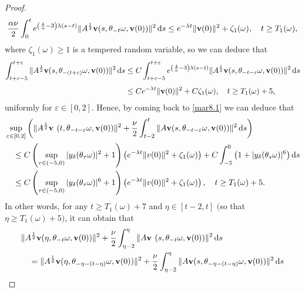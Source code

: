 \documentclass{elsarticle}
\theoremstyle{definition}
\numberwithin{equation}{section}
\renewcommand{\d}{{\rm{d}}}
\begin{document}
\begin{proof}
\begin{align*}
  \frac {\alpha  \nu }2\int_0^te^{ \left( \frac 4 \alpha -3  \right) \lambda (s-t)}\|A^{\frac12}\textbf{v}(s, \theta_{-t}\omega, \textbf{v}(0))\|^2\, \d s
 \leq e^{-\lambda t}\|\textbf{v}(0)\|^2
 + \zeta_1(\omega) ,\quad t\geq T_1(\omega) ,
 \end{align*}
where $\zeta_1(\omega)\geq 1$ is a tempered random variable,
so we can deduce that
\begin{align*}
  \int^{t+\varepsilon}_{t+\varepsilon-5}  \|A^{\frac12}\textbf{v}(s,\theta_{-(t+\varepsilon)} \omega, \textbf{v}(0)) \|^2 \, \d s
  &\leq  C \int^{t+\varepsilon}_{t+\varepsilon-5}  e^{ \left( \frac 4 \alpha -3  \right) \lambda (s-t)}\|A^{\frac12}\textbf{v}(s,\theta_{-t-\varepsilon} \omega, \textbf{v}(0)) \|^2 \, \d s \\[0.8ex]
  & \leq Ce^{-\lambda t}\|\textbf{v}(0)\|^2
 + C \zeta_1(\omega) ,\quad t\geq T_1(\omega)+5 ,
\end{align*}
uniformly for $\varepsilon \in [0,2]$.  Hence, by coming back to  \eqref{mar8.1} we can deduce that
\begin{align}
 &\sup_{\varepsilon \in [0,2]} \left(\|A^{\frac12}\textbf{v }(t,\theta_{-t-\varepsilon} \omega, \textbf{v}(0)) \|^2  +  \frac{\nu }{2} \int_{t-2}^t  \|A\textbf{v} (s,\theta_{-t-\varepsilon} \omega, \textbf{v}(0)) \|^2 \, \d s\right ) \nonumber \\
&\quad \leq   C\left (  \sup_{\tau\in (-5,0)}|y_\delta(\theta_\tau\omega)|^2+1\right)\left(e^{-\lambda t}\|v(0)\|^2
 +   \zeta_1(\omega)   \right) + C\int^{0}_{-5} \left (1 +|y_\delta(\theta_s\omega)|^6 \right )    \d s \nonumber \\
 & \quad \leq   C\left (  \sup_{\tau\in (-5,0)}|y_\delta(\theta_\tau\omega)|^6+1\right)\left(e^{-\lambda t}\|v(0)\|^2
 +   \zeta_1(\omega)   \right)  , \quad t\geq T_1(\omega)+5.  \nonumber
\end{align}
 In other words,  for any  $t\geq T_1(\omega)+7$ and $\eta\in [t-2,t ]$ $($so that $\eta\geq T_1(\omega)+5)$, it can obtain that
\begin{align*}
& \|A^{\frac12}\textbf{v} (\eta ,\theta_{-t } \omega, \textbf{v}(0)) \|^2 + \frac{\nu}{2} \int_{\eta-2}^\eta  \|A\textbf{v } (s,\theta_{-t} \omega, \textbf{v}(0)) \|^2 \, \d s\\
  & \quad =  \|A^{\frac12}\textbf{v} (\eta ,\theta_{-\eta-(t-\eta) } \omega, \textbf{v}(0)) \|^2
  + \frac{\nu}{2}  \int_{\eta-2}^\eta  \|A\textbf{v} (s,\theta_{-\eta-(t-\eta)} \omega, \textbf{v}(0)) \|^2 \, \d s \\

\end{align*}
\end{proof}
\end{document}
